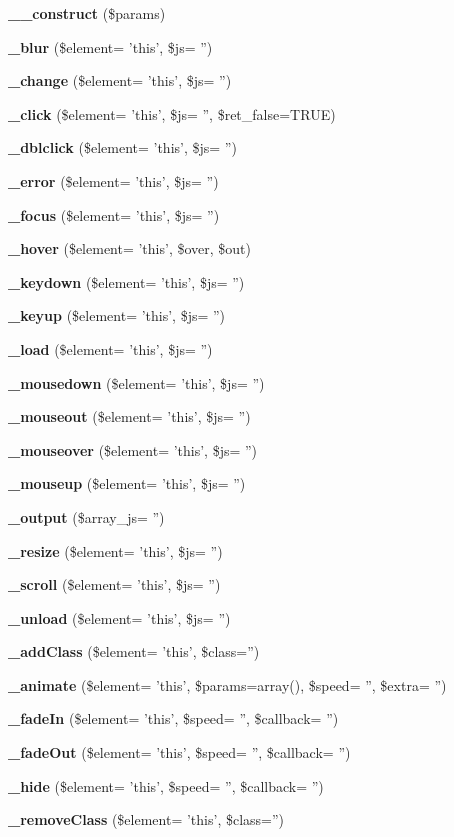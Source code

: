 \begin{DoxyCompactItemize}
\item 
{\bf \-\_\-\-\_\-construct} (\$params)
\item 
{\bf \-\_\-blur} (\$element= 'this', \$js= '')
\item 
{\bf \-\_\-change} (\$element= 'this', \$js= '')
\item 
{\bf \-\_\-click} (\$element= 'this', \$js= '', \$ret\-\_\-false=T\-R\-U\-E)
\item 
{\bf \-\_\-dblclick} (\$element= 'this', \$js= '')
\item 
{\bf \-\_\-error} (\$element= 'this', \$js= '')
\item 
{\bf \-\_\-focus} (\$element= 'this', \$js= '')
\item 
{\bf \-\_\-hover} (\$element= 'this', \$over, \$out)
\item 
{\bf \-\_\-keydown} (\$element= 'this', \$js= '')
\item 
{\bf \-\_\-keyup} (\$element= 'this', \$js= '')
\item 
{\bf \-\_\-load} (\$element= 'this', \$js= '')
\item 
{\bf \-\_\-mousedown} (\$element= 'this', \$js= '')
\item 
{\bf \-\_\-mouseout} (\$element= 'this', \$js= '')
\item 
{\bf \-\_\-mouseover} (\$element= 'this', \$js= '')
\item 
{\bf \-\_\-mouseup} (\$element= 'this', \$js= '')
\item 
{\bf \-\_\-output} (\$array\-\_\-js= '')
\item 
{\bf \-\_\-resize} (\$element= 'this', \$js= '')
\item 
{\bf \-\_\-scroll} (\$element= 'this', \$js= '')
\item 
{\bf \-\_\-unload} (\$element= 'this', \$js= '')
\item 
{\bf \-\_\-add\-Class} (\$element= 'this', \$class='')
\item 
{\bf \-\_\-animate} (\$element= 'this', \$params=array(), \$speed= '', \$extra= '')
\item 
{\bf \-\_\-fade\-In} (\$element= 'this', \$speed= '', \$callback= '')
\item 
{\bf \-\_\-fade\-Out} (\$element= 'this', \$speed= '', \$callback= '')
\item 
{\bf \-\_\-hide} (\$element= 'this', \$speed= '', \$callback= '')
\item 
{\bf \-\_\-remove\-Class} (\$element= 'this', \$class='')
\item 

\end{DoxyCompactItemize}

